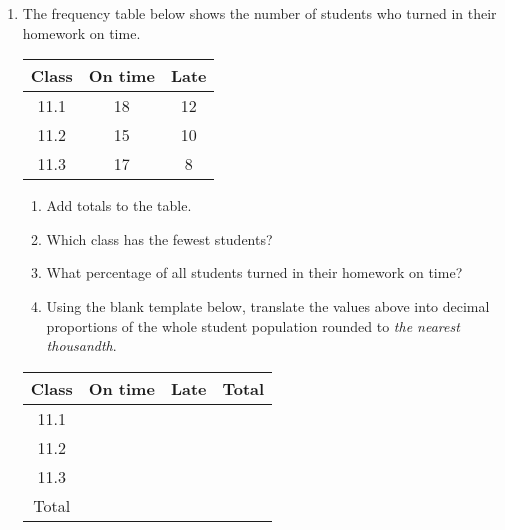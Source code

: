 \documentclass[12pt, twoside]{article}
\begin{document}
\begin{enumerate}[itemsep=0.5cm]
\newpage
\item The frequency table below shows the number of students who turned in their homework on time.
    \begin{center}
        \begin{tabular}{|c|c|c|}
            \hline
            Class & On time & Late \\
            \hline
            11.1 & 18 & 12 \\[0.25cm]
            \hline
            11.2 & 15 & 10 \\[0.25cm]
            \hline
            11.3 & 17 & 8 \\[0.25cm]
            \hline
        \end{tabular}
    \end{center} \vspace{1cm}
    \begin{enumerate}
        \item Add totals to the table.
        \item Which class has the fewest students? \vspace{1cm}
        \item What percentage of all students turned in their homework on time? \vspace{2cm}
        \item Using the blank template below, translate the values above into decimal proportions of the whole student population rounded to \emph{the nearest thousandth}.
    \end{enumerate}
    \begin{center}
        \begin{tabular}{|c|c|c|c|}
            \hline
            Class & On time & \; Late \; & \; Total \; \\
            \hline
            11.1 & & & \\[0.25cm]
            \hline
            11.2 &  & & \\[0.25cm]
            \hline
            11.3 & & & \\[0.25cm]
            \hline
            Total & & & \\[0.25cm]
            \hline
        \end{tabular}
    \end{center} 


\end{enumerate}
\end{document}
